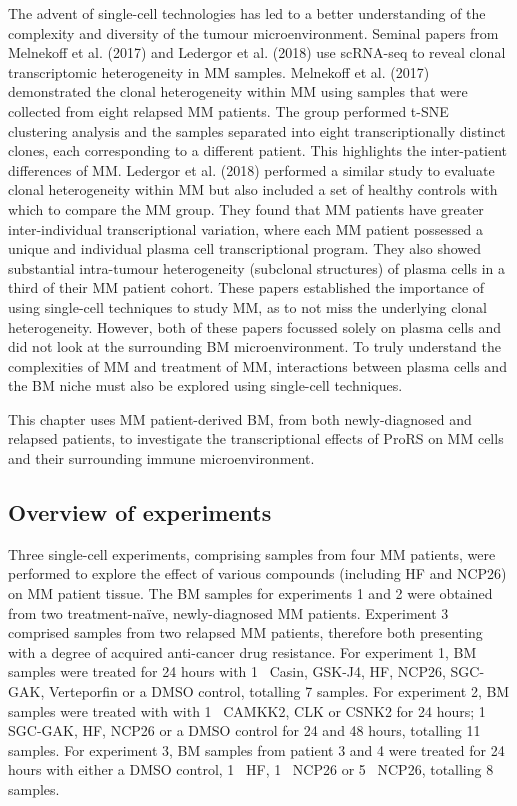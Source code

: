 The advent of single-cell technologies has led to a better understanding of the complexity and diversity of the tumour microenvironment.
Seminal papers from Melnekoff et al. (2017)\cite{melnekoff2017single} and Ledergor et al. (2018)\cite{ledergor2018single} use scRNA-seq to reveal clonal transcriptomic heterogeneity in MM samples.
Melnekoff et al. (2017) demonstrated the clonal heterogeneity within MM using samples that were collected from eight relapsed MM patients.
The group performed t-SNE clustering analysis and the samples separated into eight transcriptionally distinct clones, each corresponding to a different patient.
This highlights the inter-patient differences of MM\@.
Ledergor et al. (2018) performed a similar study to evaluate clonal heterogeneity within MM but also included a set of healthy controls with which to compare the MM group.
They found that MM patients have greater inter-individual transcriptional variation, where each MM patient possessed a unique and individual plasma cell transcriptional program.
They also showed substantial intra-tumour heterogeneity (subclonal structures) of plasma cells in a third of their MM patient cohort.
These papers established the importance of using single-cell techniques to study MM, as to not miss the underlying clonal heterogeneity.
However, both of these papers focussed solely on plasma cells and did not look at the surrounding BM microenvironment.
To truly understand the complexities of MM and treatment of MM, interactions between plasma cells and the BM niche must also be explored using single-cell techniques.

This chapter uses MM patient-derived BM, from both newly-diagnosed and relapsed patients, to investigate the transcriptional effects of ProRS on MM cells and their surrounding immune microenvironment.

\subsection{Overview of experiments}\label{subsec:scrna_experiment}
Three single-cell experiments, comprising samples from four MM patients, were performed to explore the effect of various compounds (including HF and NCP26) on MM patient tissue.
The BM samples for experiments 1 and 2 were obtained from two treatment-na\"ive, newly-diagnosed MM patients.
Experiment 3 comprised samples from two relapsed MM patients, therefore both presenting with a degree of acquired anti-cancer drug resistance.
For experiment 1, BM samples were treated for 24 hours with 1\si{\micro\Molar} Casin, GSK-J4, HF, NCP26, SGC-GAK, Verteporfin or a DMSO control, totalling 7 samples.
For experiment 2, BM samples were treated with with 1\si{\micro\Molar} CAMKK2, CLK or CSNK2 for 24 hours; 1\si{\micro\Molar} SGC-GAK, HF, NCP26 or a DMSO control for 24 and 48 hours, totalling 11 samples.
For experiment 3, BM samples from patient 3 and 4 were treated for 24 hours with either a DMSO control, 1\si{\micro\Molar} HF, 1\si{\micro\Molar} NCP26 or 5\si{\micro\Molar} NCP26, totalling 8 samples.

